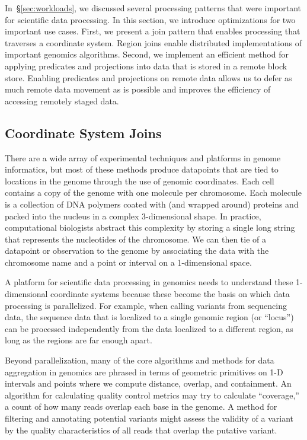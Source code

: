 \documentclass{acm_proc_article-sp}
\begin{document}
In~\S\ref{sec:workloads}, we discussed several processing patterns that were important for scientific
data processing. In this section, we introduce optimizations for two important use cases. First, we present
a join pattern that enables processing that traverses a coordinate system. Region joins enable distributed
implementations of important genomics algorithms. Second, we implement an efficient method for
applying predicates and projections into data that is stored in a remote block store. Enabling predicates
and projections on remote data allows us to defer as much remote data movement as is possible and
improves the efficiency of accessing remotely staged data.

\subsection{Coordinate System Joins}
\label{sec:coordinate-system-joins}

There are a wide array of experimental techniques and platforms in genome informatics, but most of these
methods produce datapoints that are tied to locations in the genome through the use of genomic coordinates.
Each cell contains a copy of the genome with one molecule per chromosome. Each molecule is a collection of
DNA polymers coated with (and wrapped around) proteins and packed into the nucleus in a complex
3-dimensional shape. In practice, computational biologists abstract this complexity by storing a single long
string that represents the nucleotides of the chromosome. We can then tie of a datapoint or observation to the
genome by associating the data with the chromosome name and a point or interval on a 1-dimensional space.

A platform for scientific data processing in genomics needs to understand these 1-dimensional coordinate
systems because these become the basis on which data processing is parallelized. For example, when calling
variants from sequencing data, the sequence data that is localized to a single genomic region (or ``locus'') can be 
processed independently from the data localized to a different region, as long as the regions are far enough
apart.

Beyond parallelization, many of the core algorithms and methods for data aggregation in genomics are phrased
in terms of geometric primitives on 1-D intervals and points where we compute distance, overlap, and
containment.  An algorithm for calculating quality control metrics may try to calculate ``coverage,'' a count
of how many reads overlap each base in the genome. A method for filtering and annotating potential variants
might assess the validity of a variant by the quality characteristics of all reads that overlap the putative variant.
\end{document}
